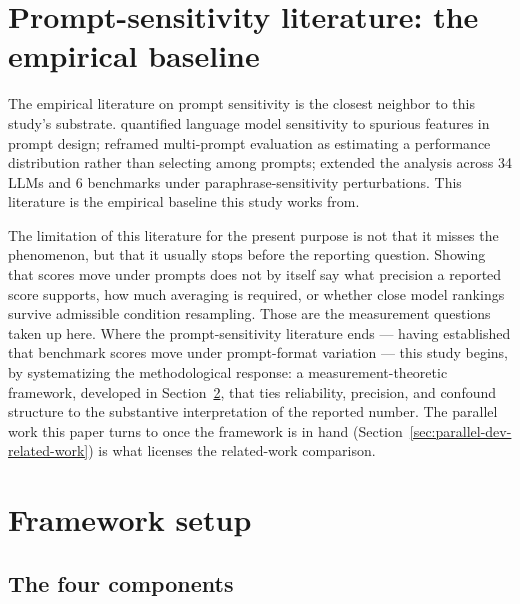 \documentclass[11pt]{article}
\begin{document}

\section{Prompt-sensitivity literature: the empirical baseline}
\label{sec:prompt-sensitivity}

The empirical literature on prompt sensitivity is the closest neighbor to this study's substrate. \citet{sclar2023quantifying} quantified language model sensitivity to spurious features in prompt design; \citet{polo2024efficient} reframed multi-prompt evaluation as estimating a performance distribution rather than selecting among prompts; \citet{lunardi2025robustness} extended the analysis across 34 LLMs and 6 benchmarks under paraphrase-sensitivity perturbations. This literature is the empirical baseline this study works from.

The limitation of this literature for the present purpose is not that it misses the phenomenon, but that it usually stops before the reporting question. Showing that scores move under prompts does not by itself say what precision a reported score supports, how much averaging is required, or whether close model rankings survive admissible condition resampling. Those are the measurement questions taken up here. Where the prompt-sensitivity literature ends --- having established that benchmark scores move under prompt-format variation --- this study begins, by systematizing the methodological response: a measurement-theoretic framework, developed in Section~\ref{sec:framework}, that ties reliability, precision, and confound structure to the substantive interpretation of the reported number. The parallel work this paper turns to once the framework is in hand (Section~\ref{sec:parallel-dev-related-work}) is what licenses the related-work comparison.


\section{Framework setup}
\label{sec:framework}


\subsection{The four components}
\label{sec:framework-components}
\end{document}
